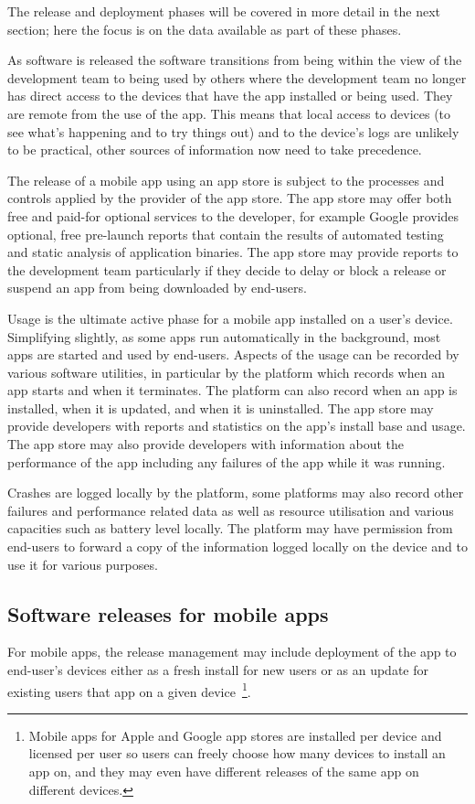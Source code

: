 The release and deployment phases will be covered in more detail in the next section; here the focus is on the data available as part of these phases. 

As software is released the software transitions from being within the view of the development team to being used by others where the development team no longer has direct access to the devices that have the app installed or being used. They are remote from the use of the app. This means that local access to devices (to see what's happening and to try things out) and to the device's logs are unlikely to be practical, other sources of information now need to take precedence.

The release of a mobile app using an app store is subject to the processes and controls applied by the provider of the app store. The app store may offer both free and paid-for optional services to the developer, for example Google provides optional, free pre-launch reports that contain the results of automated testing and static analysis of application binaries. The app store may provide reports to the development team particularly if they decide to delay or block a release or suspend an app from being downloaded by end-users.

Usage is the ultimate active phase for a mobile app installed on a user's device. Simplifying slightly, as some apps run automatically in the background, most apps are started and used by end-users. Aspects of the usage can be recorded by various software utilities, in particular by the platform which records when an app starts and when it terminates. The platform can also record when an app is installed, when it is updated, and when it is uninstalled. The app store may provide developers with reports and statistics on the app's install base and usage. The app store may also provide developers with information about the performance of the app including any failures of the app while it was running.

Crashes are logged locally by the platform, some platforms may also record other failures and performance related data as well as resource utilisation and various capacities such as battery level locally. The platform may have permission from end-users to forward a copy of the information logged locally on the device and to use it for various purposes.  

\subsection{Software releases for mobile apps}
For mobile apps, the release management may include deployment of the app to end-user's devices either as a fresh install for new users or as an update for existing users that app on a given device~\footnote{Mobile apps for Apple and Google app stores are installed per device and licensed per user so users can freely choose how many devices to install an app on, and they may even have different releases of the same app on different devices.}.

